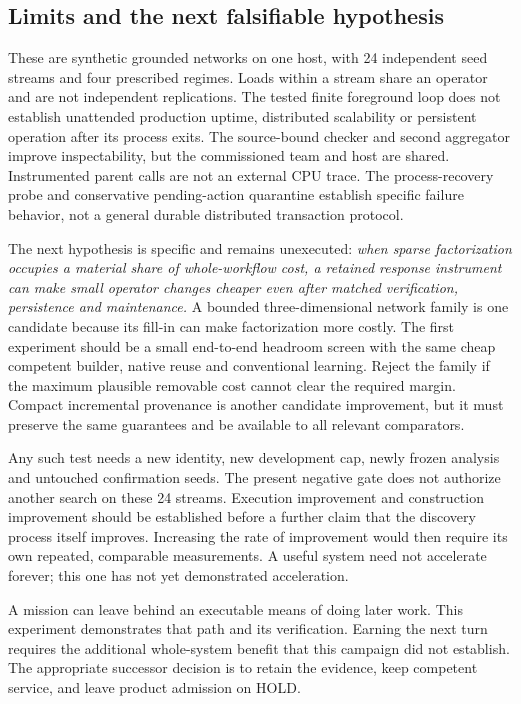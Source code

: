\subsection{Limits and the next falsifiable hypothesis}

These are synthetic grounded networks on one host, with 24 independent seed streams and four prescribed
regimes. Loads within a stream share an operator and are not independent replications. The tested finite
foreground loop does not establish unattended production uptime, distributed scalability or persistent
operation after its process exits. The source-bound checker and second aggregator improve inspectability,
but the commissioned team and host are shared. Instrumented parent calls are not an external CPU trace.
The process-recovery probe and conservative pending-action quarantine establish specific failure behavior,
not a general durable distributed transaction protocol.

The next hypothesis is specific and remains unexecuted: \emph{when sparse factorization occupies a material
share of whole-workflow cost, a retained response instrument can make small operator changes cheaper even
after matched verification, persistence and maintenance.} A bounded three-dimensional network family is one
candidate because its fill-in can make factorization more costly. The first experiment should be a small
end-to-end headroom screen with the same cheap competent builder, native reuse and conventional learning.
Reject the family if the maximum plausible removable cost cannot clear the required margin. Compact
incremental provenance is another candidate improvement, but it must preserve the same guarantees and be
available to all relevant comparators.

Any such test needs a new identity, new development cap, newly frozen analysis and untouched confirmation
seeds. The present negative gate does not authorize another search on these 24 streams. Execution improvement
and construction improvement should be established before a further claim that the discovery process itself
improves. Increasing the rate of improvement would then require its own repeated, comparable measurements.
A useful system need not accelerate forever; this one has not yet demonstrated acceleration.

\begin{insight}
A mission can leave behind an executable means of doing later work. This experiment demonstrates that path
and its verification. Earning the next turn requires the additional whole-system benefit that this campaign
did not establish. The appropriate successor decision is to retain the evidence, keep competent service,
and leave product admission on \textsf{HOLD}.
\end{insight}
